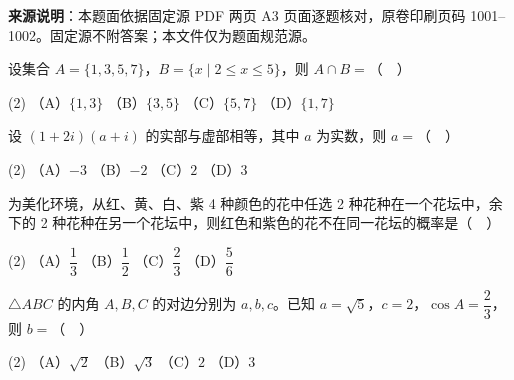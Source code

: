 


\begin{gktip}
\textbf{来源说明}：本题面依据固定源 PDF 两页 A3 页面逐题核对，原卷印刷页码 1001–1002。固定源不附答案；本文件仅为题面规范源。
\end{gktip}


\begin{question}
设集合 \(A=\{1,3,5,7\}\)，\(B=\{x\mid 2\leq x\leq 5\}\)，则 \(A\cap B=\)（　）

\begin{gkopts}(2)
\task （A）\(\{1,3\}\)
\task （B）\(\{3,5\}\)
\task （C）\(\{5,7\}\)
\task （D）\(\{1,7\}\)
\end{gkopts}

\end{question}
\begin{question}
设 \((1+2i)(a+i)\) 的实部与虚部相等，其中 \(a\) 为实数，则 \(a=\)（　）

\begin{gkopts}(2)
\task （A）\(-3\)
\task （B）\(-2\)
\task （C）\(2\)
\task （D）\(3\)
\end{gkopts}

\end{question}
\begin{question}
为美化环境，从红、黄、白、紫 4 种颜色的花中任选 2 种花种在一个花坛中，余下的 2 种花种在另一个花坛中，则红色和紫色的花不在同一花坛的概率是（　）

\begin{gkopts}(2)
\task （A）\(\dfrac{1}{3}\)
\task （B）\(\dfrac{1}{2}\)
\task （C）\(\dfrac{2}{3}\)
\task （D）\(\dfrac{5}{6}\)
\end{gkopts}

\end{question}
\begin{question}
\(\triangle ABC\) 的内角 \(A,B,C\) 的对边分别为 \(a,b,c\)。已知 \(a=\sqrt{5}\)，\(c=2\)，\(\cos A=\dfrac{2}{3}\)，则 \(b=\)（　）

\begin{gkopts}(2)
\task （A）\(\sqrt{2}\)
\task （B）\(\sqrt{3}\)
\task （C）\(2\)
\task （D）\(3\)
\end{gkopts}

\end{question}
